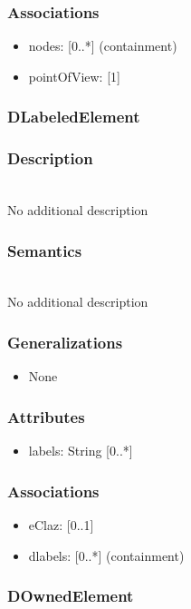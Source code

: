 \documentclass{article}
\begin{document}
\subsubsection*{Associations}
\begin{itemize}
\item nodes:  [0..*] (containment) 
\item pointOfView:  [1] 
\end{itemize}
\subsubsection{DLabeledElement}\label{DLabeledElement} 
\subsubsection*{Description} ~\\ No additional description
\subsubsection*{Semantics} ~\\ No additional description
\subsubsection*{Generalizations}
\begin{itemize}
\item None
\end{itemize}
\subsubsection*{Attributes}
\begin{itemize}
\item labels: String [0..*] 
\end{itemize}
\subsubsection*{Associations}
\begin{itemize}
\item eClaz:  [0..1] 
\item dlabels:  [0..*] (containment) 
\end{itemize}
\subsubsection{DOwnedElement}\label{DOwnedElement} 
\end{document}

